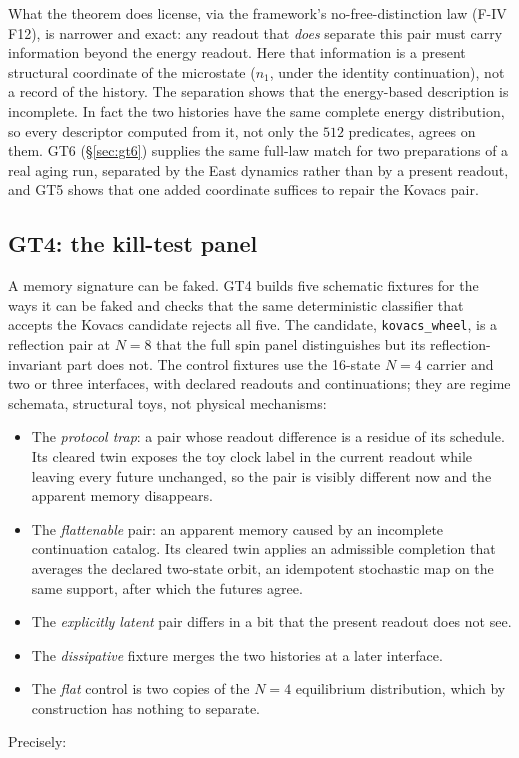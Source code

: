 What the theorem does license, via the framework's no-free-distinction law (F-IV F12), is narrower
and exact: any readout that \emph{does} separate this pair must carry information beyond the
energy readout. Here that information is a present structural coordinate of the microstate
($n_1$, under the identity continuation), not a record of the history. The separation shows that
the energy-based description is incomplete. In fact the two histories have the same complete
energy distribution, so every descriptor computed from it, not only the $512$ predicates, agrees
on them. GT6 (\S\ref{sec:gt6}) supplies the same full-law match for two preparations of a real
aging run, separated by the East dynamics rather than by a present readout, and GT5 shows that
one added coordinate suffices to repair the Kovacs pair.

\subsection{GT4: the kill-test panel}

A memory signature can be faked. GT4 builds five schematic fixtures for the ways it can be faked
and checks that the same deterministic classifier that accepts the Kovacs candidate rejects all
five. The candidate, \texttt{kovacs\_wheel}, is a reflection pair at $N=8$ that the full spin panel
distinguishes but its reflection-invariant part does not. The control fixtures use the 16-state $N=4$ carrier and two or three
interfaces, with declared readouts and continuations; they are regime schemata, structural toys,
not physical mechanisms:
\begin{itemize}
  \item The \emph{protocol trap}: a pair whose readout difference is a residue of its schedule.
    Its cleared twin exposes the toy clock label in the current readout while leaving every
    future unchanged, so the pair is visibly different now and the apparent memory disappears.
  \item The \emph{flattenable} pair: an apparent memory caused by an incomplete continuation
    catalog. Its cleared twin applies an admissible completion that averages the declared
    two-state orbit, an idempotent stochastic map on the same support, after which the futures
    agree.
  \item The \emph{explicitly latent} pair differs in a bit that the present readout does not see.
  \item The \emph{dissipative} fixture merges the two histories at a later interface.
  \item The \emph{flat} control is two copies of the $N=4$ equilibrium distribution, which by
    construction has nothing to separate.
\end{itemize}
Precisely:

